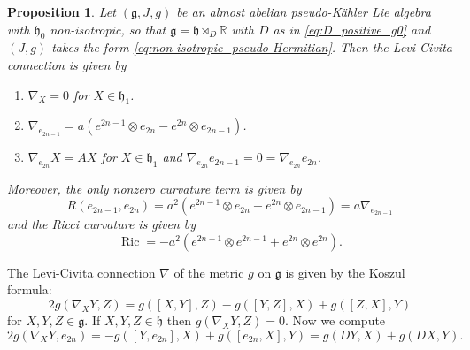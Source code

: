 \documentclass[10pt,a4paper]{amsart}
\newtheorem{proposition}{Proposition}
\newcommand{\R}{\mathbb{R}}
\DeclareMathOperator{\Ric}{Ric}
\newcommand{\frg}{\mathfrak{g}}
\newcommand{\frh}{\mathfrak{h}}
\newcommand{\g}{\lie g}
\newcommand{\h}{\lie h}
\newcommand{\lie}[1]{\mathfrak{#1}}
\begin{document}
\begin{proposition}\label{prop:curvature_definite_g0}
    Let $(\frg,J,g)$ be an almost abelian pseudo-Kähler Lie algebra with $\frh_0$ non-isotropic, so that $\g=\h\rtimes_D\R$ with $D$ as in \eqref{eq:D_positive_g0} and $(J,g)$ takes the form \eqref{eq:non-isotropic_pseudo-Hermitian}. Then the Levi-Civita connection is given by \begin{enumerate}
        \item $\nabla_X=0$ for $X\in\frh_1$.
        \item $\nabla_{e_{2n-1}}=a(e^{2n-1}\otimes e_{2n}-e^{2n}\otimes e_{2n-1})$.
        \item $\nabla_{e_{2n}}X=AX$ for $X\in\frh_1$ and $\nabla_{e_{2n}}e_{2n-1}=0=\nabla_{e_{2n}}e_{2n}$.
    \end{enumerate}

    Moreover, the only nonzero curvature term is given by $$R(e_{2n-1},e_{2n})=a^2(e^{2n-1}\otimes e_{2n}-e^{2n}\otimes e_{2n-1})=a\nabla_{e_{2n-1}}$$ and the Ricci curvature is given by $$\Ric=-a^2(e^{2n-1}\otimes e^{2n-1}+e^{2n}\otimes e^{2n}).$$
\end{proposition}

    The Levi-Civita connection $\nabla$ of the metric $g$ on $\frg$ is given by the Koszul formula: \begin{equation}\label{eq:Koszul}
        2g(\nabla_XY,Z)=g([X,Y],Z)-g([Y,Z],X)+g([Z,X],Y)
    \end{equation} for $X,Y,Z\in\frg$. If $X,Y,Z\in\frh$ then $g(\nabla_XY,Z)=0$. Now we compute $$2g(\nabla_XY,e_{2n})=-g([Y,e_{2n}],X)+g([e_{2n},X],Y)=g(DY,X)+g(DX,Y).$$
\end{document}
